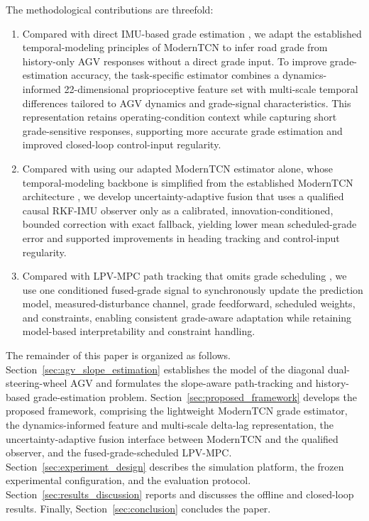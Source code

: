 \documentclass{ieeeaccess}
\newcommand{\citep}[1]{\cite{#1}}
\begin{document}
The methodological contributions are threefold:
\begin{enumerate}
\item Compared with direct IMU-based grade estimation
\citep{Jauch2018IMUGradeOrientation,Li2022QuaternionUKFGrade,
Kim2023InertialRoadPitch}, we adapt the established temporal-modeling
principles of ModernTCN \citep{Luo2024ModernTCN} to infer road grade
from history-only AGV responses without a direct grade input. To
improve grade-estimation accuracy, the task-specific estimator combines
a dynamics-informed 22-dimensional proprioceptive feature set with
multi-scale temporal differences tailored to AGV dynamics and
grade-signal characteristics. This representation retains
operating-condition context while capturing short grade-sensitive
responses, supporting more accurate grade estimation and improved
closed-loop control-input regularity.
\item Compared with using our adapted ModernTCN estimator alone, whose
temporal-modeling backbone is simplified from the established ModernTCN
architecture \citep{Luo2024ModernTCN}, we develop uncertainty-adaptive fusion that
uses a qualified causal RKF-IMU observer \citep{Chen2024RobustAttitude} only as a calibrated,
innovation-conditioned, bounded correction with exact fallback,
yielding lower mean scheduled-grade error and supported improvements
in heading tracking and control-input regularity.

\item Compared with LPV-MPC path tracking that omits grade scheduling
\citep{Alcala2020AutonomousRacingLPVMPC,
Tian2022GainScheduledLPVMPC,Cheng2021VelocityVaryingMPC}, we use one
conditioned fused-grade signal to synchronously update the prediction
model, measured-disturbance channel, grade feedforward, scheduled
weights, and constraints, enabling consistent grade-aware adaptation
while retaining model-based interpretability and constraint handling.
\end{enumerate}

The remainder of this paper is organized as follows.
Section~\ref{sec:agv_slope_estimation} establishes the model of the diagonal
dual-steering-wheel AGV and formulates the slope-aware path-tracking and
history-based grade-estimation problem.
Section~\ref{sec:proposed_framework} develops the proposed framework,
comprising the lightweight ModernTCN grade estimator, the dynamics-informed
feature and multi-scale delta-lag representation, the uncertainty-adaptive
fusion interface between ModernTCN and the qualified observer, and the fused-grade-scheduled LPV-MPC.
Section~\ref{sec:experiment_design} describes the simulation platform, the
frozen experimental configuration, and the evaluation protocol.
Section~\ref{sec:results_discussion} reports and discusses the offline and
closed-loop results. Finally, Section~\ref{sec:conclusion} concludes the
paper.
\end{document}
